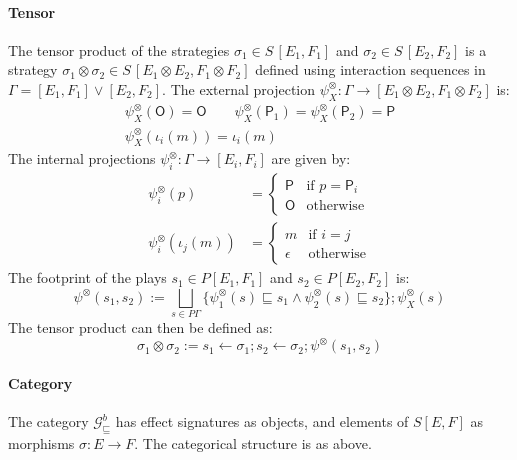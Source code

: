 \documentclass[sigplan,screen]{acmart}
\newcommand{\gcat}{\mathcal{G}_{\sqsubseteq}}
\newcommand{\kw}[1]{\ensuremath{ \mathsf{#1} }}
\begin{document}

\paragraph{Tensor} %

The tensor product of the strategies
$\sigma_1 \in S\,[E_1,F_1]$ and 
$\sigma_2 \in S\,[E_2,F_2]$
is a strategy
$\sigma_1 \otimes \sigma_2 \in S\,[E_1 \otimes E_2, F_1 \otimes F_2]$
defined using interaction sequences in
$\Gamma = [E_1,F_1] \vee [E_2,F_2]$.
The external projection
$\psi^\otimes_X : \Gamma \rightarrow [E_1 \otimes E_2, F_1 \otimes F_2]$
is:
\begin{gather*}
  \psi^\otimes_X(\kw{O}) = \kw{O} \qquad
  \psi^\otimes_X(\kw{P}_1) = \psi^\otimes_X(\kw{P}_2) = \kw{P} \\
  \psi^\otimes_X(\iota_i(m)) = \iota_i(m)
\end{gather*}
The internal projections
$\psi^\otimes_i : \Gamma \rightarrow [E_i, F_i]$
are given by:
\begin{align*}
  \psi^\otimes_i(p) &= \begin{cases}
    \kw{P} & \text{if } p = \kw{P}_i \\
    \kw{O} & \text{otherwise}
  \end{cases} \\
  \psi^\otimes_i(\iota_j(m)) &= \begin{cases}
    m & \text{if } i = j \\
    \epsilon & \text{otherwise}
  \end{cases}
\end{align*}
The footprint of the plays
$s_1 \in P [E_1,F_1]$ and $s_2 \in P [E_2, F_2]$
is:
\[
  \psi^\otimes(s_1, s_2) :=
  \bigsqcup_{s \in P \Gamma}
  \{ \psi^\otimes_1(s) \sqsubseteq s_1 \wedge
     \psi^\otimes_2(s) \sqsubseteq s_2 \} ;
  \psi^\otimes_X(s)
\]
The tensor product can then be defined as:
\[
  \sigma_1 \otimes \sigma_2 :=
  s_1 \leftarrow \sigma_1 ;
  s_2 \leftarrow \sigma_2 ;
  \psi^\otimes(s_1, s_2)
\]


\paragraph{Category} %

The category $\gcat^b$
has effect signatures as objects,
and elements of $S [E,F]$
as morphisms $\sigma : E \rightarrow F$.
The categorical structure is as above.

\end{document}
